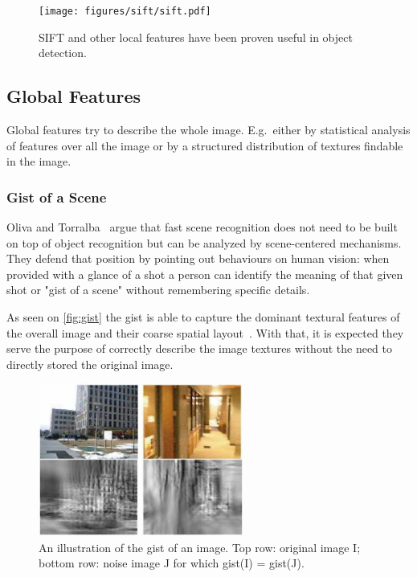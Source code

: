 \begin{figure}[h]
    \centering
    \texttt{[image: figures/sift/sift.pdf]}
    \caption{{SIFT} and other local features have been proven useful in object
             detection.}
\end{figure}


\subsection{Global Features}
Global features try to describe the whole image. E.g.\ either by
statistical analysis of features over all the image or by a structured
distribution of textures findable in the image.

\subsubsection*{Gist of a Scene}
\label{sec:gist}
Oliva and Torralba~\cite{oliva2006building} argue that fast scene recognition does not need to be
built on top of object recognition but can be analyzed by scene-centered
mechanisms.
They defend that position by pointing out behaviours on human vision:
when provided with a glance of a shot a person can identify the meaning of that
given shot or "gist of a scene" without remembering specific details.

As seen on \autoref{fig:gist} the gist is able to capture the dominant textural
features of the overall image and their coarse spatial layout~\citep{murphy2006object}.
With that, it is expected they serve the purpose of correctly describe the image
textures without the need to directly stored the original image.

\begin{figure}[h]
\center
\includegraphics[width=0.60\textwidth]{figures/gist.jpg}
\caption{\label{fig:gist}An illustration of the gist of an image. Top row: original image I;
         bottom row: noise image J for which gist(I) = gist(J).}
\end{figure}


